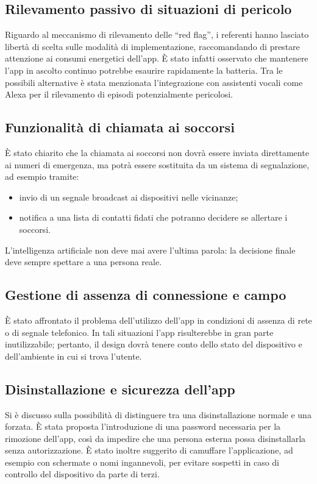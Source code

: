 \documentclass[a4paper,12pt]{article}
\begin{document}
\subsection{Rilevamento passivo di situazioni di pericolo}
Riguardo al meccanismo di rilevamento delle “red flag”, i referenti hanno lasciato libertà di scelta sulle modalità di implementazione, raccomandando di prestare attenzione ai consumi energetici dell'app.  
È stato infatti osservato che mantenere l’app in ascolto continuo potrebbe esaurire rapidamente la batteria. Tra le possibili alternative è stata menzionata l’integrazione con assistenti vocali come Alexa per il rilevamento di episodi potenzialmente pericolosi.

\subsection{Funzionalità di chiamata ai soccorsi}
È stato chiarito che la chiamata ai soccorsi non dovrà essere inviata direttamente ai numeri di emergenza, ma potrà essere sostituita da un sistema di segnalazione, ad esempio tramite:
\begin{itemize}
    \item invio di un segnale broadcast ai dispositivi nelle vicinanze;
    \item notifica a una lista di contatti fidati che potranno decidere se allertare i soccorsi.
\end{itemize}
L’intelligenza artificiale non deve mai avere l’ultima parola: la decisione finale deve sempre spettare a una persona reale.

\subsection{Gestione di assenza di connessione e campo}
È stato affrontato il problema dell’utilizzo dell’app in condizioni di assenza di rete o di segnale telefonico.  
In tali situazioni l’app risulterebbe in gran parte inutilizzabile; pertanto, il design dovrà tenere conto dello stato del dispositivo e dell’ambiente in cui si trova l’utente.

\subsection{Disinstallazione e sicurezza dell’app}
Si è discusso sulla possibilità di distinguere tra una disinstallazione normale e una forzata.  
È stata proposta l’introduzione di una password necessaria per la rimozione dell’app, così da impedire che una persona esterna possa disinstallarla senza autorizzazione.  
È stato inoltre suggerito di camuffare l’applicazione, ad esempio con schermate o nomi ingannevoli, per evitare sospetti in caso di controllo del dispositivo da parte di terzi.
\end{document}

